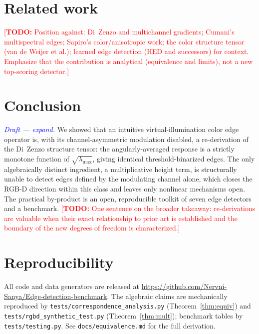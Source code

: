 \documentclass[11pt,a4paper]{article}
\newcommand{\todo}[1]{\textcolor{red}{[\textbf{TODO:} #1]}}
\newcommand{\note}[1]{\textcolor{blue}{\textit{#1}}}
\theoremstyle{plain}
\theoremstyle{definition}
\newcommand{\lmax}{\lambda_{\max}}
\begin{document}
\section{Related work}
\label{sec:related}
\todo{Position against: Di~Zenzo and multichannel gradients; Cumani's
multispectral edges; Sapiro's color/anisotropic work; the color structure
tensor (van de Weijer et al.); learned edge detection (HED and successors)
for context. Emphasize that the contribution is analytical (equivalence and
limits), not a new top-scoring detector.}

\section{Conclusion}
\label{sec:conclusion}
\note{Draft --- expand.}
We showed that an intuitive virtual-illumination color edge operator is, with
its channel-asymmetric modulation disabled, a re-derivation of the Di~Zenzo
structure tensor: the angularly-averaged response is a strictly monotone
function of $\sqrt{\lmax}$, giving identical threshold-binarized edges. The
only algebraically distinct ingredient, a multiplicative height term, is
structurally unable to detect edges defined by the modulating channel alone,
which closes the RGB-D direction within this class and leaves only nonlinear
mechanisms open. The practical by-product is an open, reproducible toolkit of
seven edge detectors and a benchmark.
\todo{One sentence on the broader takeaway: re-derivations are valuable when
their exact relationship to prior art is established and the boundary of the
new degrees of freedom is characterized.}

\section*{Reproducibility}
All code and data generators are released at
\url{https://github.com/Nervni-Sanya/Edge-detection-benchmark}.
The algebraic claims are mechanically reproduced by
\texttt{tests/correspondence\_analysis.py} (Theorem~\ref{thm:equiv}) and
\texttt{tests/rgbd\_synthetic\_test.py} (Theorem~\ref{thm:mult}); benchmark
tables by \texttt{tests/testing.py}. See \texttt{docs/equivalence.md} for the
full derivation.
\end{document}
